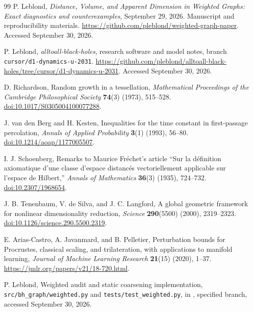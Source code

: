 \documentclass[11pt,letterpaper]{article}
\theoremstyle{definition}
\theoremstyle{remark}
\begin{document}
\clearpage
\begin{thebibliography}{99}
P. Leblond, \emph{Distance, Volume, and Apparent Dimension in Weighted Graphs: Exact diagnostics and counterexamples}, September 29, 2026. Manuscript and reproducibility materials. \url{https://github.com/pleblond/weighted-graph-paper}. Accessed September 30, 2026.

P. Leblond, \emph{alltoall-black-holes}, research software and model notes, branch \texttt{cursor/d1-dynamics-u-2031}. \url{https://github.com/pleblond/alltoall-black-holes/tree/cursor/d1-dynamics-u-2031}. Accessed September 30, 2026.

D. Richardson, Random growth in a tessellation, \emph{Mathematical Proceedings of the Cambridge Philosophical Society} \textbf{74}(3) (1973), 515--528. \href{https://doi.org/10.1017/S0305004100077288}{doi:10.1017/S0305004100077288}.

J. van den Berg and H. Kesten, Inequalities for the time constant in first-passage percolation, \emph{Annals of Applied Probability} \textbf{3}(1) (1993), 56--80. \href{https://doi.org/10.1214/aoap/1177005507}{doi:10.1214/aoap/1177005507}.

I. J. Schoenberg, Remarks to Maurice Fr\'echet's article ``Sur la d\'efinition axiomatique d'une classe d'espace distanc\'es vectoriellement applicable sur l'espace de Hilbert,'' \emph{Annals of Mathematics} \textbf{36}(3) (1935), 724--732. \href{https://doi.org/10.2307/1968654}{doi:10.2307/1968654}.

J. B. Tenenbaum, V. de Silva, and J. C. Langford, A global geometric framework for nonlinear dimensionality reduction, \emph{Science} \textbf{290}(5500) (2000), 2319--2323. \href{https://doi.org/10.1126/science.290.5500.2319}{doi:10.1126/science.290.5500.2319}.

E. Arias-Castro, A. Javanmard, and B. Pelletier, Perturbation bounds for Procrustes, classical scaling, and trilateration, with applications to manifold learning, \emph{Journal of Machine Learning Research} \textbf{21}(15) (2020), 1--37. \url{https://jmlr.org/papers/v21/18-720.html}.

P. Leblond, Weighted audit and static coarsening implementation, \texttt{src/bh\_graph/weighted.py} and \texttt{tests/test\_weighted.py}, in \cite{leblondBranch}, specified branch, accessed September 30, 2026.


\end{thebibliography}
\end{document}
